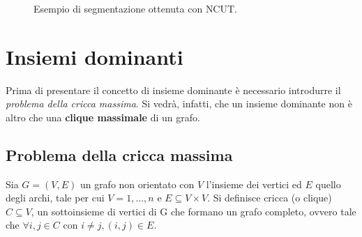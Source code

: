 \begin{figure}[h!]
    \centering
	\caption{Esempio di segmentazione ottenuta con NCUT.}
\end{figure}



\newpage

\section{Insiemi dominanti} %

Prima di presentare il concetto di insieme dominante è necessario introdurre il \emph{problema della cricca massima}. Si vedrà, infatti, che un insieme dominante non è altro che una \textbf{clique massimale} di un grafo.

\subsection{Problema della cricca massima} %
\label{ssec:problema_della_cricca_massima}
Sia $G=(V,E)$ un grafo non orientato con $V$ l'insieme dei vertici ed $E$ quello degli archi, tale per cui $V={1,\dots,n}$ e $E \subseteq V \times V$. Si definisce cricca (o clique) $C \subseteq V$, un sottoinsieme di vertici di G che formano un grafo completo, ovvero tale che $\forall i,j \in C$ con $i \neq j, (i,j) \in E$.

